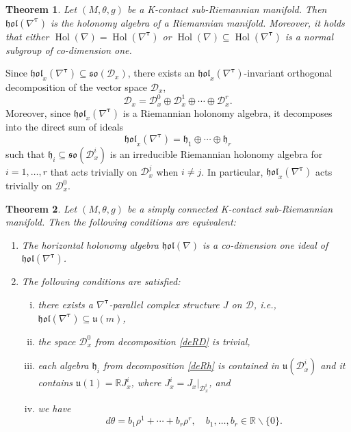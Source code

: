 \documentclass{amsart}
\theoremstyle{plain}
\newtheorem{theorem}{Theorem}[section]
\theoremstyle{definition}
\newcommand{\Hol}{\operatorname{Hol}}
\def\so{\mathfrak{so}}
\def\u{\mathfrak{u}}
\newcommand{\h}{\mathfrak{h}}
\newcommand{\hol}{\mathfrak{hol}}
\newcommand{\bt}{{\boldsymbol{\tau}}}
\newcommand{\Real}{\mathbb{R}}
\newcommand{\1}{\mathbf{1}}
\newcommand{\D}{{\mathcal D}}
\newcommand{\+}{\oplus}
\begin{document}
\begin{theorem}
	Let $(M,\theta,g)$ be a  K-contact sub-Riemannian manifold.  
	Then $\hol(\nabla^\bt)$ is the holonomy algebra of a Riemannian manifold. Moreover, it holds that either $\Hol(\nabla)=\Hol(\nabla^\bt)$ or $\Hol(\nabla)\subseteq\Hol(\nabla^\bt)$ is a normal subgroup of co-dimension one.
\end{theorem}

Since $\hol_x(\nabla^\bt)\subseteq \so(\D_x)$,
there exists an $\hol_x(\nabla^\bt)$-invariant orthogonal decomposition of the vector space $\D_x$,
\begin{equation}\label{deRD} \D_x=\D^0_x\oplus \D_x^1\oplus\cdots\oplus \D_x^r.\end{equation}
Moreover, since $\hol_x(\nabla^\bt)$ is a Riemannian holonomy algebra, it decomposes into the direct sum of ideals \begin{equation}\label{deRh}\hol_x(\nabla^\bt)=\h_1\oplus\cdots\oplus \h_r\end{equation}
such that $\h_i\subseteq \so(\D_x^i)$ is an irreducible Riemannian holonomy algebra for $i=1,\dots, r$ that acts trivially on $\D_x^j$ when $i\not=j$. In particular,   $\hol_x(\nabla^\bt)$ acts trivially on  $\D^0_x$.


\begin{theorem}\label{thCriter} Let $(M,\theta,g)$ be a simply connected K-contact sub-Riemannian manifold. Then the following conditions are equivalent: 
	\begin{enumerate}
		\item	
		The horizontal holonomy algebra  $\hol(\nabla)$ is a co-dimension one  ideal of  $\hol(\nabla^\bt)$.
		

				\item  The following conditions are satisfied:
				\begin{enumerate}[(i)]
				\item  there exists a $\nabla^\bt$-parallel  complex structure  $J$ on $\D$, i.e., $\hol(\nabla^\bt)\subseteq\u(m)$,
				\item the space $\D^0_x$ from decomposition \eqref{deRD} is trivial,
				\item each algebra $\h_i$ from  decomposition \eqref{deRh} is contained in $\u(\D^i_x)$ and it contains  $\u(1)=\Real J_x^i$, where $J_x^i={J_x}|_{\D^i_x}$, and
				\item
	we have
		\begin{equation}\label{conddtheta=}d\theta=b_1\rho^1+\cdots+ b_r\rho^r,\quad b_1,\dots, b_r\in \Real\backslash\{0\}.\end{equation}
		\end{enumerate}

	\end{enumerate}	
\end{theorem}
\end{document}

